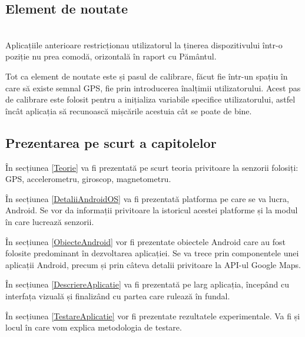 \documentclass[12pt, a4paper, oneside]{article}
\begin{document}
\subsection{Element de noutate}
\\

Aplicațiile anterioare restricționau utilizatorul la ținerea dispozitivului într-o poziție nu prea comodă, orizontală în raport cu Pământul.

Tot ca element de noutate este și pasul de calibrare, făcut fie într-un spațiu în care să existe semnal GPS, fie prin introducerea înalțimii utilizatorului. Acest pas de calibrare este folosit pentru a inițializa variabile specifice utilizatorului, astfel încât aplicația să recunoască mișcările acestuia cât se poate de bine.


\subsection{Prezentarea pe scurt a capitolelor}

În secțiunea \ref{Teorie} va fi prezentată pe scurt teoria privitoare la senzorii folosiți: GPS, accelerometru, giroscop, magnetometru.

În secțiunea \ref{DetaliiAndroidOS} va fi prezentată platforma pe care se va lucra, Android. Se vor da informații privitoare la istoricul acestei platforme și la modul în care lucrează senzorii.

În secțiunea \ref{ObiecteAndroid} vor fi prezentate obiectele Android care au fost folosite predominant în dezvoltarea aplicației. Se va trece prin componentele unei aplicații Android, precum și prin câteva detalii privitoare la API-ul Google Maps.

În secțiunea \ref{DescriereAplicatie} va fi prezentată pe larg aplicația, începând cu interfața vizuală și finalizând cu partea care rulează în fundal.

În secțiunea \ref{TestareAplicatie} vor fi prezentate rezultatele experimentale. Va fi și locul în care vom explica metodologia de testare.
\end{document}
